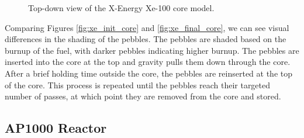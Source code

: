 \begin{figure}[H]
    \hfill
    \caption{Top-down view of the X-Energy Xe-100 core model.}
    \label{fig:xe_core}
  \end{figure}

Comparing Figures \ref{fig:xe_init_core} and \ref{fig:xe_final_core}, we can see visual differences in the shading of the pebbles. The pebbles are shaded based on the burnup of the fuel, with darker pebbles indicating higher burnup. The pebbles are inserted into the core at the top and gravity pulls them down through the core. After a brief holding time outside the core, the pebbles are reinserted at the top of the core. This process is repeated until the pebbles reach their targeted number of passes, at which point they are removed from the core and stored.

\subsection{AP1000 Reactor}
\label{sec:ap}

